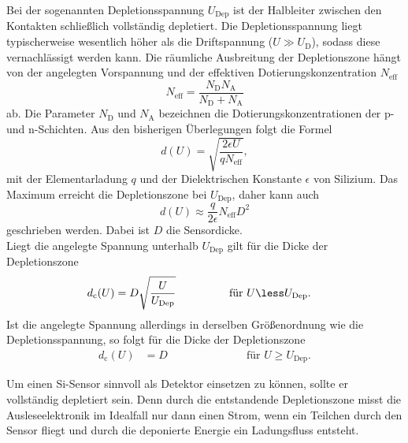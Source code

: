 Bei der sogenannten Depletionsspannung $U_\text{Dep}$ ist der Halbleiter zwischen den Kontakten schließlich vollständig depletiert.
Die Depletionsspannung liegt typischerweise wesentlich höher als die
Driftspannung ($U \gg U_\text{D}$), sodass diese vernachlässigt werden kann. Die räumliche Ausbreitung der Depletionszone hängt von der angelegten Vorspannung und der effektiven Dotierungskonzentration
$N_\text{eff}$
\begin{equation}
  N_\text{eff} = \frac{N_\text{D}N_\text{A}}{N_\text{D}+N_\text{A}}
\end{equation}
ab.
Die Parameter $N_\text{D}$ und $N_\text{A}$ bezeichnen die Dotierungskonzentrationen der p- und n-Schichten. Aus den bisherigen Überlegungen folgt die Formel
\begin{equation}
  d(U) = \sqrt{\frac{2\epsilon U}{q N_\text{eff}}},
\end{equation}
mit der Elementarladung $q$ und der Dielektrischen Konstante $\epsilon$ von Silizium. Das Maximum erreicht die Depletionszone bei $U_\text{Dep}$, daher kann auch
\begin{equation}
  d(U) \approx \frac{q}{2\epsilon} N_\text{eff}D^2
\end{equation}
geschrieben werden. Dabei ist $D$ die Sensordicke.\\
Liegt die angelegte Spannung unterhalb $U_\text{Dep}$ gilt für die Dicke der Depletionszone
\begin{align}
  d_\text{c}(U) &= D\sqrt{\frac{U}{U_\text{Dep}}} \hspace{1.7cm}\text{für } U \less U_\text{Dep}.
  \label{eqn:dicke-depletionszone}
\end{align}
Ist die angelegte Spannung allerdings in derselben Größenordnung wie die Depletionsspannung, so folgt für die Dicke der Depletionszone
 \begin{align*}
   d_\text{c}(U) &= D \hspace{3cm}\text{für } U \ge U_\text{Dep}.
 \end{align*}

Um einen Si-Sensor sinnvoll als Detektor einsetzen zu können, sollte er vollständig depletiert sein. Denn durch die entstandende Depletionszone misst die Ausleseelektronik im Idealfall nur dann einen Strom, wenn ein Teilchen durch den Sensor fliegt und durch die deponierte Energie ein Ladungsfluss entsteht.

